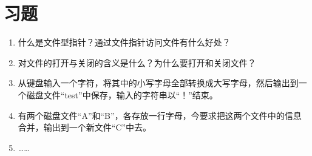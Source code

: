 \section{习题}
\begin{enumerate}
	\item 什么是文件型指针？通过文件指针访问文件有什么好处？
	\item 对文件的打开与关闭的含义是什么？为什么要打开和关闭文件？
	\item 从键盘输入一个字符，将其中的小写字母全部转换成大写字母，然后输出到一个磁盘文件“test”中保存，输入的字符串以“！”结束。
	\item 有两个磁盘文件“A”和“B”，各存放一行字母，今要求把这两个文件中的信息合并，输出到一个新文件“C”中去。
	\item ……
\end{enumerate}

